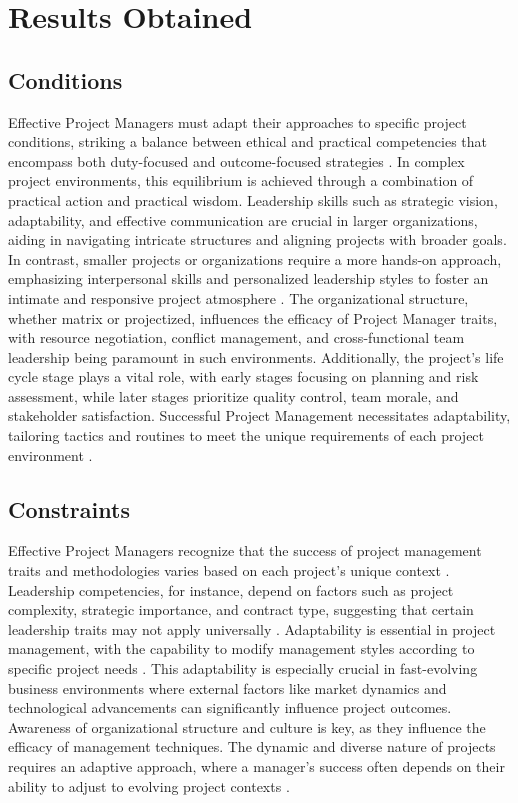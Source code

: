 \documentclass{article}
\begin{document}
\section{Results Obtained}
\subsection{Conditions}

Effective Project Managers must adapt their approaches to specific project conditions, striking a balance between ethical and practical competencies that encompass both duty-focused and outcome-focused strategies \cite{bredillet2015good}. In complex project environments, this equilibrium is achieved through a combination of practical action and practical wisdom. Leadership skills such as strategic vision, adaptability, and effective communication are crucial in larger organizations, aiding in navigating intricate structures and aligning projects with broader goals. In contrast, smaller projects or organizations require a more hands-on approach, emphasizing interpersonal skills and personalized leadership styles to foster an intimate and responsive project atmosphere \cite{sigurdhssonpatterns}. The organizational structure, whether matrix or projectized, influences the efficacy of Project Manager traits, with resource negotiation, conflict management, and cross-functional team leadership being paramount in such environments. Additionally, the project's life cycle stage plays a vital role, with early stages focusing on planning and risk assessment, while later stages prioritize quality control, team morale, and stakeholder satisfaction. Successful Project Management necessitates adaptability, tailoring tactics and routines to meet the unique requirements of each project environment \cite{hyvari2006success}.

\subsection{Constraints}

Effective Project Managers recognize that the success of project management traits and methodologies varies based on each project's unique context \cite{muller2010leadership}. Leadership competencies, for instance, depend on factors such as project complexity, strategic importance, and contract type, suggesting that certain leadership traits may not apply universally \cite{sigurdhssonpatterns}. Adaptability is essential in project management, with the capability to modify management styles according to specific project needs \cite{markopoulos2005project}. This adaptability is especially crucial in fast-evolving business environments where external factors like market dynamics and technological advancements can significantly influence project outcomes. Awareness of organizational structure and culture is key, as they influence the efficacy of management techniques. The dynamic and diverse nature of projects requires an adaptive approach, where a manager's success often depends on their ability to adjust to evolving project contexts \cite{pollack2016project}.
\end{document}
